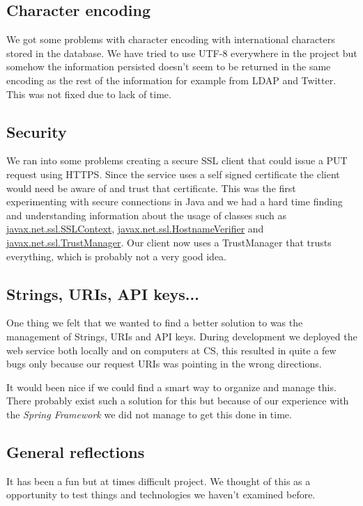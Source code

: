 \documentclass[titlepage, twocolumn, a4paper, 10pt]{article}
\begin{document}
\subsection{Character encoding}
We got some problems with character encoding with international
characters stored in the database. We have tried to use UTF-8
everywhere in the project but somehow the information persisted
doesn't seem to be returned in the same encoding as the rest of the
information for example from LDAP and Twitter. This was not fixed due
to lack of time.

\subsection{Security}\label{sec:security}
We ran into some problems creating a secure SSL client that could
issue a PUT request using HTTPS. Since the service uses a self signed
certificate the client would need be aware of and trust that
certificate. This was the first experimenting with secure connections
in Java and we had a hard time finding and understanding information
about the usage of classes such as \url{javax.net.ssl.SSLContext},
\url{javax.net.ssl.HostnameVerifier} and
\url{javax.net.ssl.TrustManager}. Our client now uses a TrustManager
that trusts everything, which is probably not a very good idea.

\subsection{Strings, URIs, API keys...}
One thing we felt that we wanted to find a better solution
to was the management of Strings, URIs and API keys.
During development we deployed the web service both
locally and on computers at CS, this resulted in quite a
few bugs only because our request URIs was pointing
in the wrong directions.

It would been nice if we could find a smart way to organize and manage
this. There probably exist such a solution for this but because of our
experience with the \textit{Spring Framework} we did not manage to get
this done in time.

\subsection{General reflections}\label{sec:reflections}
It has been a fun but at times difficult project. We thought of this
as a opportunity to test things and technologies we haven't examined
before.
\end{document}
